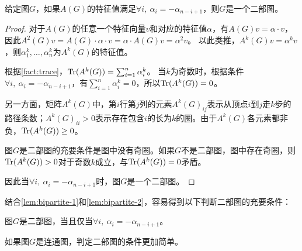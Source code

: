 \begin{lemma}\label{lem:bipartite-2}
    给定图$G$，如果$A(G)$的特征值满足$\forall i,\ \alpha_i=-\alpha_{n-i+1}$，则$G$是一个二部图。
\end{lemma}

\begin{proof}
    对于$A(G)$的任意一个特征向量$v$和对应的特征值$\alpha$，有$A(G)v=\alpha\cdot v$，因此$A^2(G)v=A(G)\cdot\alpha\cdot v=\alpha\cdot A(G)v=\alpha^2 v$。
    以此类推，$A^k(G)v=\alpha^kv$，则$\alpha_1^k,\dots,\alpha_n^k$为$A^k(G)$的特征值。
    
    根据\cref{fact:trace}，$\mathrm{Tr}(A^k(G))=\sum_{i=1}^n\alpha_i^k$。
    当$k$为奇数时，根据条件$\forall i,\ \alpha_i=-\alpha_{n-i+1}$，有$\sum_{i=1}^n\alpha_i^k=0$，所以$\mathrm{Tr}(A^k(G))=0$。
    
    另一方面，矩阵$A^k(G)$中，第$i$行第$j$列的元素$A^k(G)_{ij}$表示从顶点$i$到$j$走$k$步的路径条数；$A^k(G)_{ii}>0$表示存在包含$i$的长为$k$的圈。由于$A^k(G)$各元素都非负，$\mathrm{Tr}(A^k(G))\ge0$。
    
    图$G$是二部图的充要条件是图中没有奇圈。如果$G$不是二部图，图中存在奇圈，则$\mathrm{Tr}(A^k(G))>0$对于奇数$k$成立，与$\mathrm{Tr}(A^k(G))=0$矛盾。
    
    因此当$\forall i,\ \alpha_i=-\alpha_{n-i+1}$时，图$G$是一个二部图。
\end{proof}

结合\cref{lem:bipartite-1}和\cref{lem:bipartite-2}，容易得到以下判断二部图的充要条件：

\begin{theorem}
    图$G$是二部图，当且仅当$\forall i,\ \alpha_i=-\alpha_{n-i+1}$。
\end{theorem}

如果图$G$是连通图，判定二部图的条件更加简单。

